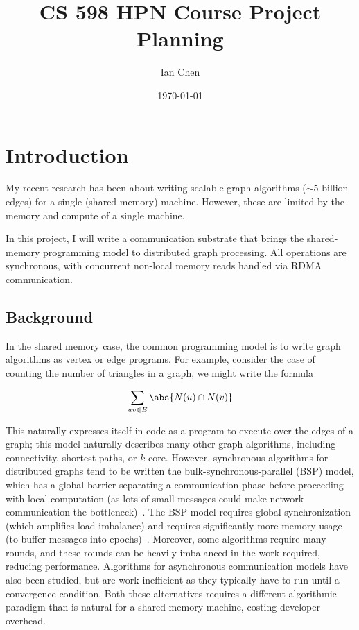 \documentclass{article}
\title{CS 598 HPN Course Project Planning}
\author{Ian Chen}
\date{\today}
\begin{document}
\maketitle

\section{Introduction}

My recent research has been about writing scalable graph algorithms ($\sim 5$ billion edges) for a single (shared-memory) machine.
However, these are limited by the memory and compute of a single machine.

In this project, I will write a communication substrate that brings the shared-memory programming model to distributed graph processing.
All operations are synchronous, with concurrent non-local memory reads handled via RDMA communication.

\subsection{Background}

In the shared memory case, the common programming model is to write graph algorithms as vertex or edge programs.
For example, consider the case of counting the number of triangles in a graph, we might write the formula

$$
    \sum_{uv \in E} \abs{N(u) \cap N(v)}
$$

This naturally expresses itself in code as a program to execute over the edges of a graph; this model naturally describes many other graph algorithms, including connectivity, shortest paths, or $k$-core.
However, synchronous algorithms for distributed graphs tend to be written the bulk-synchronous-parallel (BSP) model, which has a global barrier separating a communication phase before proceeding with local computation (as lots of small messages could make network communication the bottleneck)~\cite{dathathri2018gluon,steil2023embracing}.
The BSP model requires global synchronization (which amplifies load imbalance) and requires significantly more memory usage (to buffer messages into epochs)~\cite{mohammadiporshokooh2026overcoming}.
Moreover, some algorithms require many rounds, and these rounds can be heavily imbalanced in the work required, reducing performance.
Algorithms for asynchronous communication models have also been studied, but are work inefficient as they typically have to run until a convergence condition.
Both these alternatives requires a different algorithmic paradigm than is natural for a shared-memory machine, costing developer overhead.
\end{document}
